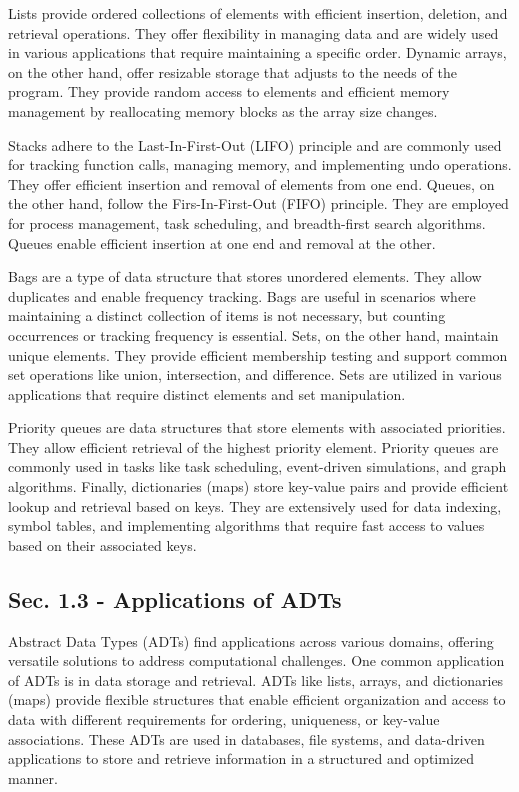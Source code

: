 Lists provide ordered collections of elements with efficient insertion, deletion, and retrieval operations. They offer flexibility in managing data and are widely used in various applications that
require maintaining a specific order. Dynamic arrays, on the other hand, offer resizable storage that adjusts to the needs of the program. They provide random access to elements and efficient memory management
by reallocating memory blocks as the array size changes.

Stacks adhere to the Last-In-First-Out (LIFO) principle and are commonly used for tracking function calls, managing memory, and implementing undo operations. They offer efficient insertion and removal
of elements from one end. Queues, on the other hand, follow the Firs-In-First-Out (FIFO) principle. They are employed for process management, task scheduling, and breadth-first search algorithms. Queues enable
efficient insertion at one end and removal at the other.

Bags are a type of data structure that stores unordered elements. They allow duplicates and enable frequency tracking. Bags are useful in scenarios where maintaining a distinct collection of items is not
necessary, but counting occurrences or tracking frequency is essential. Sets, on the other hand, maintain unique elements. They provide efficient membership testing and support common set operations like union,
intersection, and difference. Sets are utilized in various applications that require distinct elements and set manipulation.

Priority queues are data structures that store elements with associated priorities. They allow efficient retrieval of the highest priority element. Priority queues are commonly used in tasks like task
scheduling, event-driven simulations, and graph algorithms. Finally, dictionaries (maps) store key-value pairs and provide efficient lookup and retrieval based on keys. They are extensively used for data indexing,
symbol tables, and implementing algorithms that require fast access to values based on their associated keys.

\subsection*{Sec. 1.3 - Applications of ADTs}
Abstract Data Types (ADTs) find applications across various domains, offering versatile solutions to address computational challenges. One common application of ADTs is in data storage and retrieval. ADTs like lists,
arrays, and dictionaries (maps) provide flexible structures that enable efficient organization and access to data with different requirements for ordering, uniqueness, or key-value associations. These ADTs are used in
databases, file systems, and data-driven applications to store and retrieve information in a structured and optimized manner.

